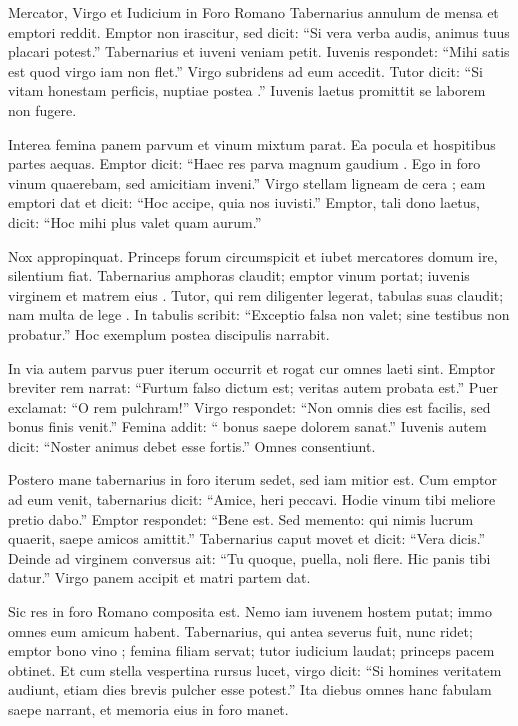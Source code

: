 \documentclass[12pt]{nextbook}
\begin{document}
\begin{readersection}{Mercator, Virgo et Iudicium in Foro Romano}
Tabernarius annulum de mensa  et emptori reddit. Emptor non irascitur, sed dicit: “Si vera verba audis, animus tuus placari potest.” Tabernarius  et iuveni veniam petit. Iuvenis respondet: “Mihi satis est quod virgo iam non flet.” Virgo subridens ad eum accedit. Tutor dicit: “Si vitam honestam perficis, nuptiae postea .” Iuvenis laetus promittit se laborem non fugere.

Interea femina panem parvum et vinum mixtum parat. Ea pocula  et hospitibus  partes aequas. Emptor dicit: “Haec res parva magnum gaudium . Ego in foro vinum quaerebam, sed amicitiam inveni.” Virgo stellam ligneam de cera ; eam emptori dat et dicit: “Hoc  accipe, quia nos iuvisti.” Emptor, tali dono laetus, dicit: “Hoc mihi plus valet quam aurum.”

Nox appropinquat. Princeps  forum circumspicit et iubet mercatores domum ire,  silentium fiat. Tabernarius amphoras claudit; emptor vinum portat; iuvenis virginem et matrem eius . Tutor, qui rem diligenter legerat, tabulas suas claudit; nam multa de lege . In tabulis scribit: “Exceptio falsa non valet;  sine testibus non probatur.” Hoc exemplum postea discipulis narrabit.

In via autem parvus puer iterum occurrit et rogat cur omnes laeti sint. Emptor breviter rem narrat: “Furtum falso dictum est; veritas autem probata est.” Puer exclamat: “O rem pulchram!” Virgo respondet: “Non omnis dies est facilis, sed  bonus finis venit.” Femina addit: “ bonus saepe dolorem sanat.” Iuvenis autem dicit: “Noster animus debet esse fortis.” Omnes consentiunt.

Postero mane tabernarius in foro iterum sedet, sed iam mitior est. Cum emptor ad eum venit, tabernarius dicit: “Amice, heri peccavi. Hodie vinum tibi meliore pretio dabo.” Emptor respondet: “Bene est. Sed memento: qui nimis lucrum quaerit, saepe amicos amittit.” Tabernarius caput movet et dicit: “Vera dicis.” Deinde ad virginem conversus ait: “Tu quoque, puella, noli flere. Hic panis tibi datur.” Virgo panem accipit et matri partem dat.

Sic res in foro Romano composita est. Nemo iam iuvenem hostem putat; immo omnes eum amicum habent. Tabernarius, qui antea severus fuit, nunc ridet; emptor bono vino ; femina filiam servat; tutor iudicium laudat; princeps pacem obtinet. Et cum stella vespertina rursus lucet, virgo dicit: “Si homines veritatem audiunt, etiam dies brevis pulcher esse potest.” Ita  diebus omnes hanc fabulam saepe narrant, et memoria eius in foro manet.

\end{readersection}
\end{document}
